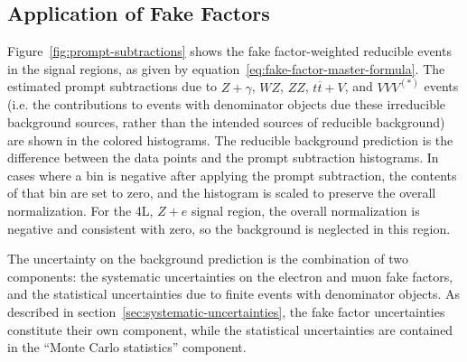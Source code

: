 \subsection{Application of Fake Factors}\label{sec:fake-factor-application}
Figure~\ref{fig:prompt-subtractions} shows the fake factor-weighted reducible events in the signal regions, as given by equation~\ref{eq:fake-factor-master-formula}. The estimated prompt subtractions due to $Z+\gamma$, $WZ$, $ZZ$, $t\overline{t}+V$, and $VVV^{(*)}$ events (i.e. the contributions to events with denominator objects due these irreducible background sources, rather than the intended sources of reducible background) are shown in the colored histograms. The reducible background prediction is the difference between the data points and the prompt subtraction histograms. In cases where a bin is negative after applying the prompt subtraction, the contents of that bin are set to zero, and the histogram is scaled to preserve the overall normalization. For the 4L, $Z+e$ signal region, the overall normalization is negative and consistent with zero, so the background is neglected in this region. 

The uncertainty on the background prediction is the combination of two components: the systematic uncertainties on the electron and muon fake factors, and the statistical uncertainties due to finite events with denominator objects. As described in section~\ref{sec:systematic-uncertainties}, the fake factor uncertainties constitute their own component, while the statistical uncertainties are contained in the ``Monte Carlo statistics'' component. 

